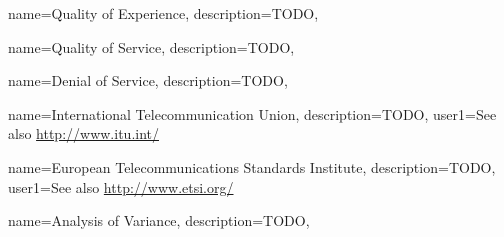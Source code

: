 {
  name=Quality of Experience,
  description={TODO},
}

{
  name=Quality of Service,
  description={TODO},
}

{
  name=Denial of Service,
  description={TODO},
}

{
  name=International Telecommunication Union,
  description={TODO},
  user1={See also \url{http://www.itu.int/}}
}

{
  name=European Telecommunications Standards Institute,
  description={TODO},
  user1={See also \url{http://www.etsi.org/}}
}

{
  name=Analysis of Variance,
  description={TODO},
}

